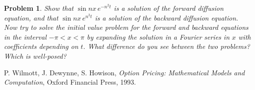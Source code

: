 \documentclass[12pt]{article}
\newtheorem{problem}{Problem}[section]
\begin{document}
\begin{problem}
Show that \(\sin nx \, e^{-n^2t}\) is a solution of the forward diffusion equation, and that \(\sin nx \, e^{n^2t}\) is a solution of the backward diffusion equation. Now try to solve the initial value problem for the forward and backward equations in the interval \(-\pi < x < \pi\) by expanding the solution in a Fourier series in \(x\) with coefficients depending on \(t\). What difference do you see between the two problems? Which is well-posed?

    
\end{problem}

\begin{thebibliography}{9}

P. Wilmott, J. Dewynne, S. Howison,
\textit{Option Pricing: Mathematical Models and Computation},
Oxford Financial Press, 1993.

\end{thebibliography}
\end{document}
